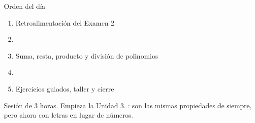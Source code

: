 \documentclass[aspectratio=169,10pt]{beamer}
\begin{document}
\portada

\begin{frame}{Orden del día}
  \begin{enumerate}
    \item Retroalimentación del Examen 2
    \item {}
    \item Suma, resta, producto y división de polinomios
    \item {}
    \item Ejercicios guiados, taller y cierre
  \end{enumerate}

  \vspace{0.25cm}
  {\footnotesize\color{uniGris} Sesión de 3 horas. Empieza la Unidad 3.
  : son las mismas propiedades de siempre, pero
  ahora con letras en lugar de números.}
\end{frame}
\end{document}
